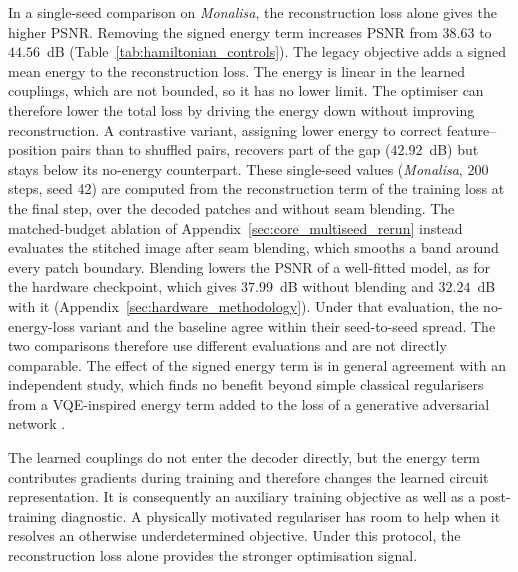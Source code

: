 \documentclass[pdflatex,sn-basic]{sn-jnl}
\begin{document}
In a single-seed comparison on \textit{Monalisa}, the reconstruction loss alone gives the higher PSNR.
Removing the signed energy term increases PSNR from $38.63$ to $44.56$~dB (Table~\ref{tab:hamiltonian_controls}).
The legacy objective adds a signed mean energy to the reconstruction loss.
The energy is linear in the learned couplings, which are not bounded, so it has no lower limit.
The optimiser can therefore lower the total loss by driving the energy down without improving reconstruction.
A contrastive variant, assigning lower energy to correct feature--position pairs than to shuffled pairs, recovers part of the gap ($42.92$~dB) but stays below its no-energy counterpart.
These single-seed values (\textit{Monalisa}, 200 steps, seed 42) are computed from the reconstruction term of the training loss at the final step, over the decoded patches and without seam blending.
The matched-budget ablation of Appendix~\ref{sec:core_multiseed_rerun} instead evaluates the stitched image after seam blending, which smooths a band around every patch boundary.
Blending lowers the PSNR of a well-fitted model, as for the hardware checkpoint, which gives $37.99$~dB without blending and $32.24$~dB with it (Appendix~\ref{sec:hardware_methodology}).
Under that evaluation, the no-energy-loss variant and the baseline agree within their seed-to-seed spread.
The two comparisons therefore use different evaluations and are not directly comparable.
The effect of the signed energy term is in general agreement with an independent study, which finds no benefit beyond simple classical regularisers from a VQE-inspired energy term added to the loss of a generative adversarial network \citep{Strnadel2025}.

The learned couplings do not enter the decoder directly, but the energy term contributes gradients during training and therefore changes the learned circuit representation.
It is consequently an auxiliary training objective as well as a post-training diagnostic.
A physically motivated regulariser has room to help when it resolves an otherwise underdetermined objective.
Under this protocol, the reconstruction loss alone provides the stronger optimisation signal.
\end{document}
